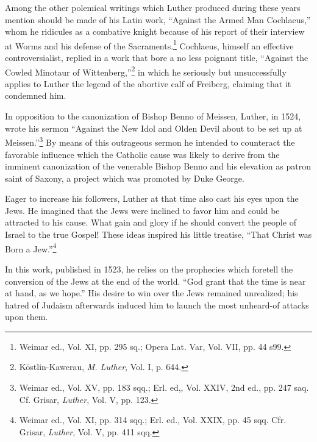 Among the other polemical writings which Luther produced during these
years mention should be made of his Latin work, “Against
the Armed Man Cochlaeus,” whom he ridicules as a combative
knight because of his report of their interview at Worms and his
defense of the Sacraments.\footnote{Weimar ed., Vol. XI, pp. 295 sq.; Opera Lat. Var, Vol. VII, pp. 44 s99.}
Cochlaeus, himself an effective controversialist,
replied in a work that bore a no less poignant title,
“Against the Cowled Minotaur of Wittenberg,”\footnote
{Köstlin-Kawerau, \textit{M. Luther}, Vol. I, p. 644.}
in which he
seriously but unsuccessfully applies to Luther the legend of the abortive
calf of Freiberg, claiming that it condemned him.

In opposition to the canonization of Bishop Benno of Meissen,
Luther, in 1524, wrote his sermon “Against the New Idol and Olden
Devil about to be set up at Meissen.”\footnote
{Weimar ed., Vol. XV, pp. 183 sqq.; Erl. ed,, Vol. XXIV, 2nd ed., pp. 247 saq. Cf.
Grisar, \textit{Luther}, Vol. V, pp. 123.}
By means of this outrageous
sermon he intended to counteract the favorable influence which the
Catholic cause was likely to derive from the imminent canonization
of the venerable Bishop Benno and his elevation as patron saint of
Saxony, a project which was promoted by Duke George.

Eager to increase his followers, Luther at that time also cast his
eyes upon the Jews. He imagined that the Jews were inclined to
favor him and could be attracted to his cause. What gain and glory if
he should convert the people of Israel to the true Gospel! These ideas
inspired his little treatise, “That Christ was Born a Jew.”\footnote
{Weimar ed., Vol. XI, pp. 314 sqq.; Erl. ed., Vol. XXIX, pp. 45 sqq. Cfr. Grisar,
\textit{Luther}, Vol. V, pp. 411 sqq.}


In this
work, published in 1523, he relies on the prophecies which foretell the
conversion of the Jews at the end of the world. “God grant that the
time is near at hand, as we hope.” His desire to win over the Jews
remained unrealized; his hatred of Judaism afterwards induced him
to launch the most unheard-of attacks upon them.

